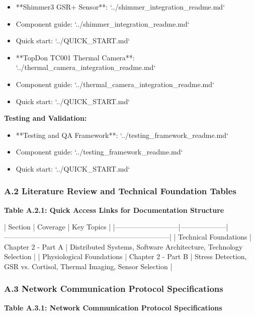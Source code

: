 \documentclass[12pt,a4paper]{article}
\begin{document}
\begin{itemize}
\item **Shimmer3 GSR+ Sensor**: `../shimmer_integration_readme.md`
\item Component guide: `../shimmer_integration_readme.md`
\item Quick start: `../QUICK_START.md`

\item **TopDon TC001 Thermal Camera**: `../thermal_camera_integration_readme.md`
\item Component guide: `../thermal_camera_integration_readme.md`
\item Quick start: `../QUICK_START.md`

\end{itemize}
\textbf{Testing and Validation:}

\begin{itemize}
\item **Testing and QA Framework**: `../testing_framework_readme.md`
\item Component guide: `../testing_framework_readme.md`
\item Quick start: `../QUICK_START.md`

\end{itemize}
\subsubsection{A.2 Literature Review and Technical Foundation Tables}

\textbf{Table A.2.1: Quick Access Links for Documentation Structure}

| Section                   | Coverage           | Key Topics                                                            |
|---------------------------|--------------------|-----------------------------------------------------------------------|
| Technical Foundations     | Chapter 2 - Part A | Distributed Systems, Software Architecture, Technology Selection      |
| Physiological Foundations | Chapter 2 - Part B | Stress Detection, GSR vs. Cortisol, Thermal Imaging, Sensor Selection |

\subsubsection{A.3 Network Communication Protocol Specifications}

\textbf{Table A.3.1: Network Communication Protocol Specifications}
\end{document}
